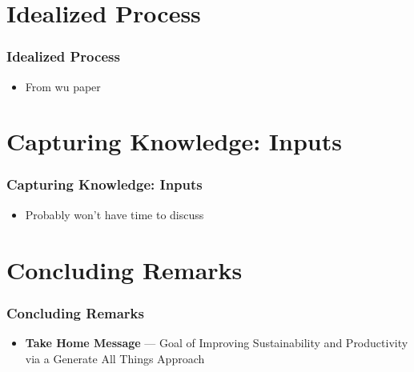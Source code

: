\documentclass[usenames]{beamer}
\begin{document}
\section[Idealized Process]{Idealized Process}


\begin{frame}

\frametitle{Idealized Process}

\begin{itemize}
\item From wu paper
\end{itemize}

\end{frame}


\section[Inputs]{Capturing Knowledge: Inputs}


\begin{frame}

\frametitle{Capturing Knowledge: Inputs}

\begin{itemize}
\item Probably won't have time to discuss
\end{itemize}

\end{frame}


\section[Concluding Remarks]{Concluding Remarks}


\begin{frame}

\frametitle{Concluding Remarks}

\begin{itemize}
\item \textbf{Take Home Message} --- Goal of Improving Sustainability and
Productivity via a Generate All Things Approach
\end{itemize}

\end{frame}
\end{document}
